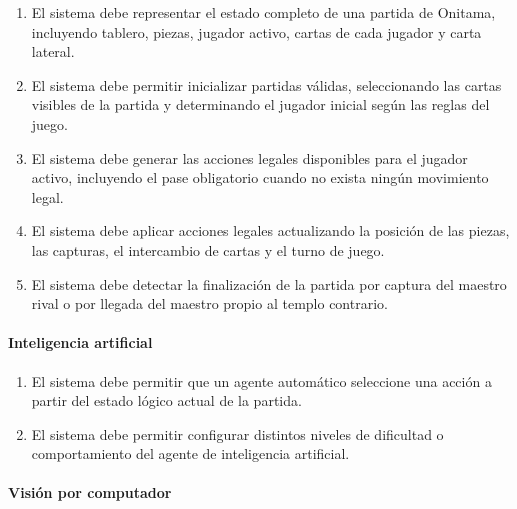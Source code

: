 \begin{enumerate}[label=\textbf{RF-\twodigits*:}, leftmargin=2.2cm]
    \item El sistema debe representar el estado completo de una partida de Onitama, incluyendo tablero, piezas, jugador activo, cartas de cada jugador y carta lateral.

    \item El sistema debe permitir inicializar partidas válidas, seleccionando las cartas visibles de la partida y determinando el jugador inicial según las reglas del juego.

    \item El sistema debe generar las acciones legales disponibles para el jugador activo, incluyendo el pase obligatorio cuando no exista ningún movimiento legal.

    \item El sistema debe aplicar acciones legales actualizando la posición de las piezas, las capturas, el intercambio de cartas y el turno de juego.

    \item El sistema debe detectar la finalización de la partida por captura del maestro rival o por llegada del maestro propio al templo contrario.
\end{enumerate}

\paragraph{Inteligencia artificial}

\begin{enumerate}[label=\textbf{RF-\twodigits*:}, leftmargin=2.2cm, resume]
    \item El sistema debe permitir que un agente automático seleccione una acción a partir del estado lógico actual de la partida.

    \item El sistema debe permitir configurar distintos niveles de dificultad o comportamiento del agente de inteligencia artificial.
\end{enumerate}

\paragraph{Visión por computador}

